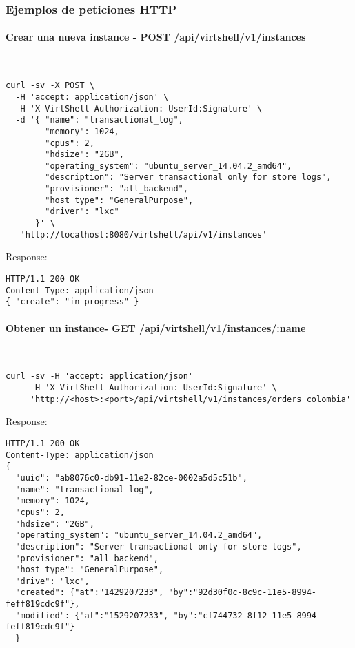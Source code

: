 \subsubsection{Ejemplos de peticiones HTTP}

\paragraph{Crear una nueva instance - POST /api/virtshell/v1/instances} ~\\


\begin{lstlisting}[style=json]
curl -sv -X POST \
  -H 'accept: application/json' \
  -H 'X-VirtShell-Authorization: UserId:Signature' \
  -d '{ "name": "transactional_log",
        "memory": 1024,
        "cpus": 2,
        "hdsize": "2GB",
        "operating_system": "ubuntu_server_14.04.2_amd64",
        "description": "Server transactional only for store logs", 
        "provisioner": "all_backend",
        "host_type": "GeneralPurpose",
        "driver": "lxc"
      }' \
   'http://localhost:8080/virtshell/api/v1/instances'
\end{lstlisting}

Response:

\begin{lstlisting}[style=json]
HTTP/1.1 200 OK
Content-Type: application/json
{ "create": "in progress" }
\end{lstlisting}

\paragraph{Obtener un instance- GET /api/virtshell/v1/instances/:name} ~\\

\begin{lstlisting}[style=json]
curl -sv -H 'accept: application/json' 
     -H 'X-VirtShell-Authorization: UserId:Signature' \ 
     'http://<host>:<port>/api/virtshell/v1/instances/orders_colombia'
\end{lstlisting}

Response:

\begin{lstlisting}[style=json]
HTTP/1.1 200 OK
Content-Type: application/json
{
  "uuid": "ab8076c0-db91-11e2-82ce-0002a5d5c51b",
  "name": "transactional_log",
  "memory": 1024,
  "cpus": 2,
  "hdsize": "2GB",
  "operating_system": "ubuntu_server_14.04.2_amd64",
  "description": "Server transactional only for store logs", 
  "provisioner": "all_backend",
  "host_type": "GeneralPurpose",
  "drive": "lxc",
  "created": {"at":"1429207233", "by":"92d30f0c-8c9c-11e5-8994-feff819cdc9f"},
  "modified": {"at":"1529207233", "by":"cf744732-8f12-11e5-8994-feff819cdc9f"}
  }
\end{lstlisting}

